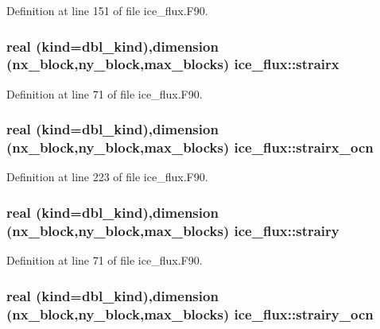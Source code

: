 Definition at line 151 of file ice\_\-flux.F90.\hypertarget{namespaceice__flux_aee8a0e6c9637760d2b7153f40ffe0dc1}{
\subsubsection[{strairx}]{\setlength{\rightskip}{0pt plus 5cm}real (kind=dbl\_\-kind),dimension (nx\_\-block,ny\_\-block,max\_\-blocks) {\bf ice\_\-flux::strairx}}}
\label{namespaceice__flux_aee8a0e6c9637760d2b7153f40ffe0dc1}


Definition at line 71 of file ice\_\-flux.F90.\hypertarget{namespaceice__flux_a95351534eb982b4f0afc45ae4455c392}{
\subsubsection[{strairx\_\-ocn}]{\setlength{\rightskip}{0pt plus 5cm}real (kind=dbl\_\-kind),dimension (nx\_\-block,ny\_\-block,max\_\-blocks) {\bf ice\_\-flux::strairx\_\-ocn}}}
\label{namespaceice__flux_a95351534eb982b4f0afc45ae4455c392}


Definition at line 223 of file ice\_\-flux.F90.\hypertarget{namespaceice__flux_af29d53fccf8950eaca0c31ea018640aa}{
\subsubsection[{strairy}]{\setlength{\rightskip}{0pt plus 5cm}real (kind=dbl\_\-kind),dimension (nx\_\-block,ny\_\-block,max\_\-blocks) {\bf ice\_\-flux::strairy}}}
\label{namespaceice__flux_af29d53fccf8950eaca0c31ea018640aa}


Definition at line 71 of file ice\_\-flux.F90.\hypertarget{namespaceice__flux_a4e7200c0bea830cf623a6cdf2218cf1c}{
\subsubsection[{strairy\_\-ocn}]{\setlength{\rightskip}{0pt plus 5cm}real (kind=dbl\_\-kind),dimension (nx\_\-block,ny\_\-block,max\_\-blocks) {\bf ice\_\-flux::strairy\_\-ocn}}}
\label{namespaceice__flux_a4e7200c0bea830cf623a6cdf2218cf1c}


